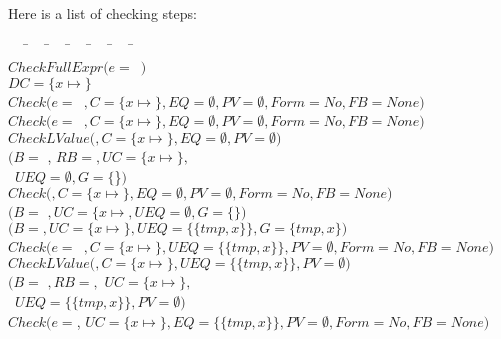 Here is a list of checking steps:
\begin{small}
\begin{tabbing}
~~~\=~~~\=~~~\=~~~\=~~~\=~~~\=~~~\=\\
$CheckFullExpr(e=$~$)$\\
\>$DC = \{x \mapsto$$\}$\\
\>$Check(e=$~$, C=\{x \mapsto$$\},  EQ=\emptyset,
           PV=\emptyset, Form = No, FB = None)$\\
\>\>$Check(e=$~$,C=\{x\mapsto$$\},
                EQ=\emptyset, PV=\emptyset, Form=No, FB=None)$ \\
  \>\>\>$CheckLValue($$, C = \{x \mapsto$$\}, EQ = \emptyset, PV = \emptyset)$ \\
  \>\>\>\>$(B = $ , $RB = $$,
                           UC = \{x \mapsto$$\},$\\
  \>\>\>\>~$UEQ = \emptyset, G = \{$\}$)$ \\
  \>\>\>$Check($$,C  =\{x\mapsto$$\}, EQ = \emptyset, PV = \emptyset, Form = No, FB = None)$\\
  \>\>\>\>$(B = $ $, UC = \{x\mapsto$$ , UEQ = \emptyset,
              G = \{$$\})$\\
 \>\>\>$(B = $$, UC = \{x\mapsto $$\}, UEQ= \{\{tmp, x\}\},
          G = \{tmp, x\})$ \\
  \>\>$Check(e=$~$, C = \{x\mapsto $$\}, UEQ= \{\{tmp, x\}\},
        PV=\emptyset, Form = No, FB = None)$\\
   \>\>\>$CheckLValue($$, C = \{x\mapsto $$\}, UEQ= \{\{tmp, x\}\},
                              PV = \emptyset)$\\
   \>\>\>\>\>$(B = $ $, RB = $$,$
                            $UC = \{x\mapsto $$\},$\\
   \>\>\>\>\>~$UEQ = \{\{tmp, x\}\},  PV = \emptyset)$\\
   \>\>\>$Check(e = $, $UC = \{x\mapsto $$\}, EQ = \{\{tmp, x\}\}, PV = \emptyset,
          Form = No, FB = None)$\\

\end{tabbing}
\end{small}
